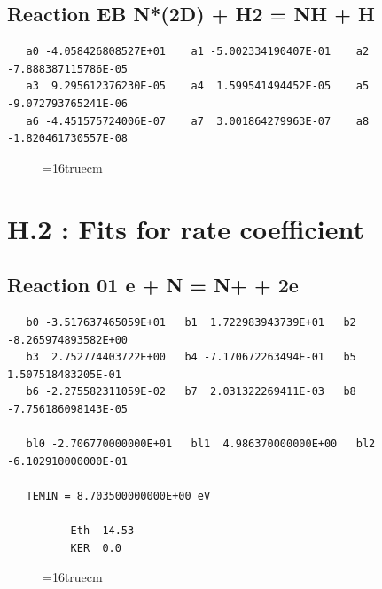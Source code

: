 \documentclass[12pt,dvipdfm]{article}
\begin{document}
\subsection{
Reaction EB N*(2D) + H2 = NH + H}
\begin{small}\begin{verbatim}
   a0 -4.058426808527E+01    a1 -5.002334190407E-01    a2 -7.888387115786E-05
   a3  9.295612376230E-05    a4  1.599541494452E-05    a5 -9.072793765241E-06
   a6 -4.451575724006E-07    a7  3.001864279963E-07    a8 -1.820461730557E-08
   \end{verbatim}\end{small}
\begin{figure}[h!] \label{n2rates}
\epsfxsize=16truecm
\end{figure}
\newpage


\section{H.2 : Fits for rate coefficient }

\subsection{
Reaction 01 e + N = N+ + 2e }
\begin{small}\begin{verbatim}
   b0 -3.517637465059E+01   b1  1.722983943739E+01   b2 -8.265974893582E+00
   b3  2.752774403722E+00   b4 -7.170672263494E-01   b5  1.507518483205E-01
   b6 -2.275582311059E-02   b7  2.031322269411E-03   b8 -7.756186098143E-05

   bl0 -2.706770000000E+01   bl1  4.986370000000E+00   bl2 -6.102910000000E-01

   TEMIN = 8.703500000000E+00 eV

          Eth  14.53
          KER  0.0
\end{verbatim}\end{small}
\begin{figure}[h!] \label{n2rates}
\epsfxsize=16truecm
\end{figure}
\newpage
\end{document}
